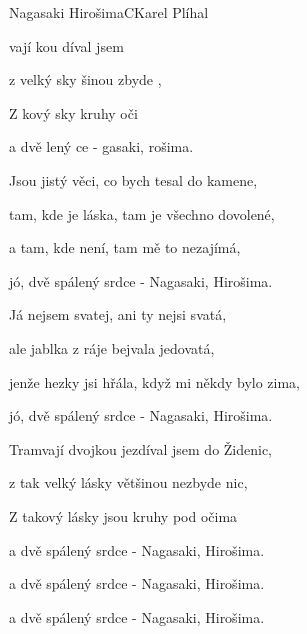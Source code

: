 \begin{song}{Nagasaki Hirošima}{C}{Karel Plíhal}

\begin{SBVerse}

vají kou díval jsem        

z  velký sky šinou zbyde ,

Z kový sky  kruhy  oči

a dvě lený ce - gasaki, rošima.    

\end{SBVerse}

\begin{SBVerse}

Jsou jistý věci, co bych tesal do kamene,

tam, kde je láska, tam je všechno dovolené,

a tam, kde není, tam mě to nezajímá,

jó, dvě spálený srdce - Nagasaki, Hirošima.

\end{SBVerse}

\begin{SBVerse}

Já nejsem svatej, ani ty nejsi svatá,

ale jablka z ráje bejvala jedovatá,

jenže hezky jsi hřála, když mi někdy bylo zima,

jó, dvě spálený srdce - Nagasaki, Hirošima.

\end{SBVerse}

\begin{SBVerse}

Tramvají dvojkou jezdíval jsem do Židenic,

z tak velký lásky většinou nezbyde nic,

Z takový lásky jsou kruhy pod očima

a dvě spálený srdce - Nagasaki, Hirošima.

a dvě spálený srdce - Nagasaki, Hirošima.

a dvě spálený srdce - Nagasaki, Hirošima.

\end{SBVerse}

\end{song}

\clearpage
